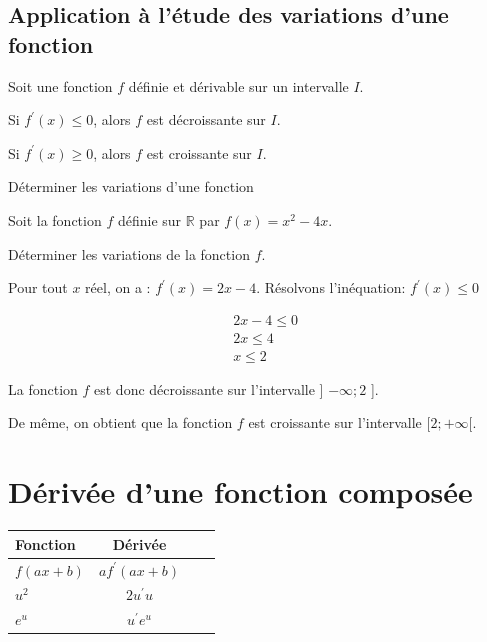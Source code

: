     \subsection{Application à l'étude des variations d'une fonction}
    
    \begin{bthm}
    	Soit une fonction $f$ définie et dérivable sur un intervalle $I$.
    	\begin{itemProp}
    		\item Si $f^{\prime}(x) \leq 0$, alors $f$ est décroissante sur $I$.
	    	\item Si $f^{\prime}(x) \geq 0$, alors $f$ est croissante sur $I$.
    	\end{itemProp}
    \end{bthm}
    
    \begin{bmethodet}{Déterminer les variations d'une fonction}
    	
    	Soit la fonction $f$ définie sur $\mathbb{R}$ par $f(x)=x^2-4 x$.
    	
    	Déterminer les variations de la fonction $f$.
    	
    	
    	Pour tout $x$ réel, on a : $f^{\prime}(x)=2 x-4$.
    	Résolvons l'inéquation: $f^{\prime}(x) \leq 0$
    	
    	$$
    	\begin{aligned}
    		& 2 x-4 \leqslant 0 \\
    		& 2 x \leqslant 4 \\
    		& x \leqslant 2
    	\end{aligned}
    	$$
    	
    	
    	La fonction $f$ est donc décroissante sur l'intervalle ] $-\infty ; 2$ ].
    	
    	De même, on obtient que la fonction $f$ est croissante sur l'intervalle $[2 ;+\infty[$.
    \end{bmethodet}
    
    \section{Dérivée d'une fonction composée}
    
    \begin{center}
    	\renewcommand{\arraystretch}{2}
    	\begin{tabular}{|Xc|Xc|}
    		\hline Fonction & Dérivée \\
    		\hline$f(a x+b)$ & $a f^{\prime}(a x+b)$ \\
    		\hline$u^2$ & $2 u^{\prime} u$ \\
    		\hline$e^u$ & $u^{\prime} e^u$ \\
    		\hline
    	\end{tabular}
    \end{center}
    
